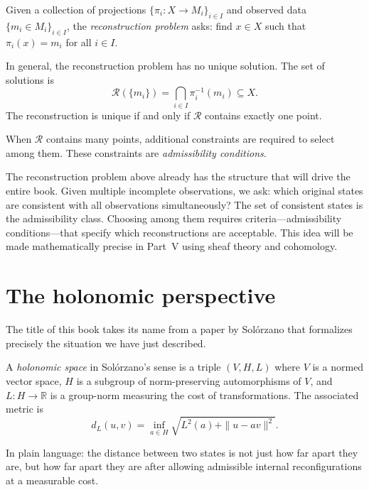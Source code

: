 \begin{definition}
  \label{def:reconstruction}
  Given a collection of projections
  $\{\pi_i : X \to M_i\}_{i \in I}$
  and observed data $\{m_i \in M_i\}_{i \in I}$,
  the \emph{reconstruction problem} asks:
  find $x \in X$ such that $\pi_i(x) = m_i$ for all $i \in I$.
\end{definition}

In general, the reconstruction problem has no unique solution.
The set of solutions is
\[
  \mathcal{R}(\{m_i\})
  = \bigcap_{i \in I} \pi_i^{-1}(m_i)
  \subseteq X.
\]
The reconstruction is unique if and only if $\mathcal{R}$ contains
exactly one point.

When $\mathcal{R}$ contains many points, additional constraints
are required to select among them.
These constraints are \emph{admissibility conditions}.

\begin{AdmPreview}
  The reconstruction problem above already has the structure
  that will drive the entire book.
  Given multiple incomplete observations, we ask:
  which original states are consistent with all observations
  simultaneously?
  The set of consistent states is the admissibility class.
  Choosing among them requires criteria---admissibility
  conditions---that specify which reconstructions are acceptable.
  This idea will be made mathematically precise in Part~V
  using sheaf theory and cohomology.
\end{AdmPreview}

\section{The holonomic perspective}

The title of this book takes its name from a paper by Solórzano
that formalizes precisely the situation we have just described.

A \emph{holonomic space} in Solórzano's sense is a triple
$(V, H, L)$ where $V$ is a normed vector space, $H$ is a subgroup
of norm-preserving automorphisms of $V$, and $L : H \to \mathbb{R}$
is a group-norm measuring the cost of transformations.
The associated metric is
\[
  d_L(u, v)
  = \inf_{a \in H} \sqrt{L^2(a) + \|u - av\|^2}.
\]

In plain language: the distance between two states is not just
how far apart they are, but how far apart they are after allowing
admissible internal reconfigurations at a measurable cost.

